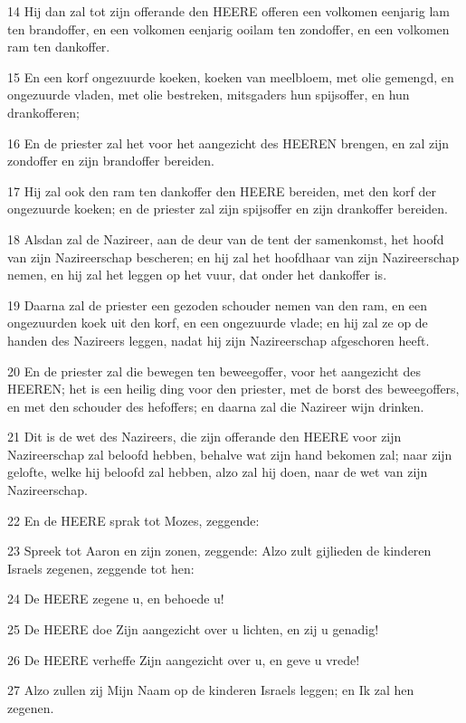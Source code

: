 \par 14 Hij dan zal tot zijn offerande den HEERE offeren een volkomen eenjarig lam ten brandoffer, en een volkomen eenjarig ooilam ten zondoffer, en een volkomen ram ten dankoffer.
\par 15 En een korf ongezuurde koeken, koeken van meelbloem, met olie gemengd, en ongezuurde vladen, met olie bestreken, mitsgaders hun spijsoffer, en hun drankofferen;
\par 16 En de priester zal het voor het aangezicht des HEEREN brengen, en zal zijn zondoffer en zijn brandoffer bereiden.
\par 17 Hij zal ook den ram ten dankoffer den HEERE bereiden, met den korf der ongezuurde koeken; en de priester zal zijn spijsoffer en zijn drankoffer bereiden.
\par 18 Alsdan zal de Nazireer, aan de deur van de tent der samenkomst, het hoofd van zijn Nazireerschap bescheren; en hij zal het hoofdhaar van zijn Nazireerschap nemen, en hij zal het leggen op het vuur, dat onder het dankoffer is.
\par 19 Daarna zal de priester een gezoden schouder nemen van den ram, en een ongezuurden koek uit den korf, en een ongezuurde vlade; en hij zal ze op de handen des Nazireers leggen, nadat hij zijn Nazireerschap afgeschoren heeft.
\par 20 En de priester zal die bewegen ten beweegoffer, voor het aangezicht des HEEREN; het is een heilig ding voor den priester, met de borst des beweegoffers, en met den schouder des hefoffers; en daarna zal die Nazireer wijn drinken.
\par 21 Dit is de wet des Nazireers, die zijn offerande den HEERE voor zijn Nazireerschap zal beloofd hebben, behalve wat zijn hand bekomen zal; naar zijn gelofte, welke hij beloofd zal hebben, alzo zal hij doen, naar de wet van zijn Nazireerschap.
\par 22 En de HEERE sprak tot Mozes, zeggende:
\par 23 Spreek tot Aaron en zijn zonen, zeggende: Alzo zult gijlieden de kinderen Israels zegenen, zeggende tot hen:
\par 24 De HEERE zegene u, en behoede u!
\par 25 De HEERE doe Zijn aangezicht over u lichten, en zij u genadig!
\par 26 De HEERE verheffe Zijn aangezicht over u, en geve u vrede!
\par 27 Alzo zullen zij Mijn Naam op de kinderen Israels leggen; en Ik zal hen zegenen.

